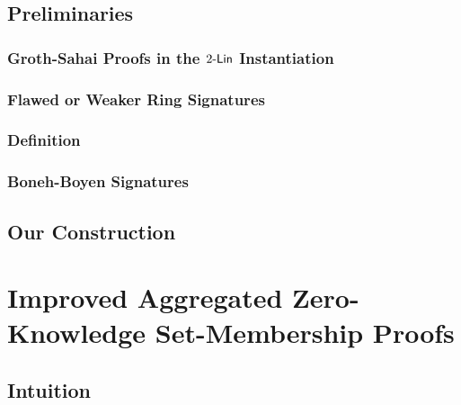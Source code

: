     \section{Preliminaries}
        
        \subsection{Groth-Sahai Proofs in the $2\mbox{-}\mathsf{Lin}$ Instantiation}
        
            

        \subsection{Flawed or Weaker Ring Signatures}\label{sec:rs-flawed}
    
            

        \subsection{Definition}
    
            

        \subsection{Boneh-Boyen Signatures} \label{sec:bbs}
    
            

    \section{Our Construction}
    
        


\chapter{Improved Aggregated Zero-Knowledge Set-Membership Proofs} \label{improved-aZKSMP} \label{sec:improved-aZKSMP}

    
        
\section{Intuition} \label{sec:improved-aZKSMP-intuition}
    
